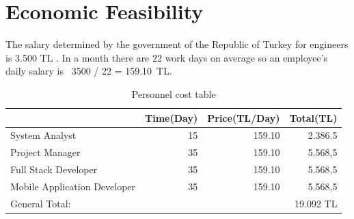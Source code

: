 \newpage
\section{Economic Feasibility}
The salary determined by the government of the Republic of Turkey for engineers
is 3.500 TL \cite{muhendisMaas}. In a month there are 22 work days on average so an employee's daily salary is \ 3500 / 22 = 159.10\ TL.

\begin{table}[!h!]
\centering
\caption{Personnel cost table}
\label{tab:maas}
\begin{tabular}{|l|r|r|r|}
\hline
& \multicolumn{1}{l|}{\textbf{Time(Day)}} & \multicolumn{1}{l|}{\textbf{Price(TL/Day)}} & \multicolumn{1}{l|}{\textbf{Total(TL)}} \\ \hline
System Analyst   & 15                                      & 159.10                                      & 2.386.5                                 \\ \hline
Project Manager      & 35                                      & 159.10                                      & 5.568,5                                 \\ \hline
Full Stack Developer     & 35                                      & 159.10                                      & 5.568,5                                 \\ \hline
Mobile Application Developer & 35                                       & 159.10                                      & 5.568,5                                  \\ \hline
General Total:      & \multicolumn{3}{r|}{19.092 TL}                                                                                                  \\ \hline
\end{tabular}
\end{table}

